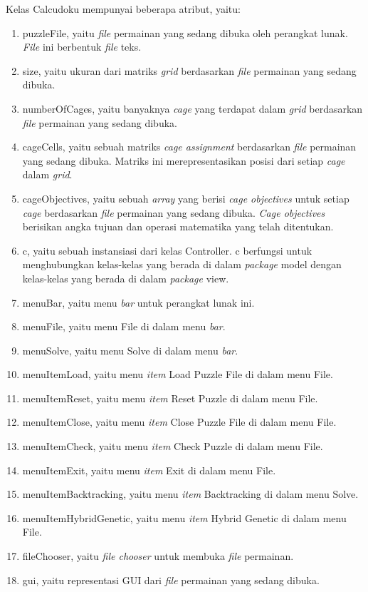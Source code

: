 Kelas Calcudoku mempunyai beberapa atribut, yaitu:

\begin{enumerate}
\item puzzleFile, yaitu \textit{file} permainan yang sedang dibuka oleh perangkat lunak. \textit{File} ini berbentuk \textit{file} teks.
\item size, yaitu ukuran dari matriks \textit{grid} berdasarkan \textit{file} permainan yang sedang dibuka.
\item numberOfCages, yaitu banyaknya \textit{cage} yang terdapat dalam \textit{grid} berdasarkan \textit{file} permainan yang sedang dibuka.
\item cageCells, yaitu sebuah matriks \textit{cage assignment} berdasarkan \textit{file} permainan yang sedang dibuka. Matriks ini merepresentasikan posisi dari setiap \textit{cage} dalam \textit{grid}.
\item cageObjectives, yaitu sebuah \textit{array} yang berisi \textit{cage objectives} untuk setiap \textit{cage} berdasarkan \textit{file} permainan yang sedang dibuka. \textit{Cage objectives} berisikan angka tujuan dan operasi matematika yang telah ditentukan.
\item c, yaitu sebuah instansiasi dari kelas Controller. c berfungsi untuk menghubungkan kelas-kelas yang berada di dalam \textit{package} model dengan kelas-kelas yang berada di dalam \textit{package} view.
\item menuBar, yaitu menu \textit{bar} untuk perangkat lunak ini.
\item menuFile, yaitu menu File di dalam menu \textit{bar}.
\item menuSolve, yaitu menu Solve di dalam menu \textit{bar}.
\item menuItemLoad, yaitu menu \textit{item} Load Puzzle File di dalam menu File.
\item menuItemReset, yaitu menu \textit{item} Reset Puzzle di dalam menu File.
\item menuItemClose, yaitu menu \textit{item} Close Puzzle File di dalam menu File.
\item menuItemCheck, yaitu menu \textit{item} Check Puzzle di dalam menu File.
\item menuItemExit, yaitu menu \textit{item} Exit di dalam menu File.
\item menuItemBacktracking, yaitu menu \textit{item} Backtracking di dalam menu Solve.
\item menuItemHybridGenetic, yaitu menu \textit{item} Hybrid Genetic di dalam menu File.
\item fileChooser, yaitu \textit{file chooser} untuk membuka \textit{file} permainan.
\item gui, yaitu representasi GUI dari \textit{file} permainan yang sedang dibuka.
\end{enumerate}

